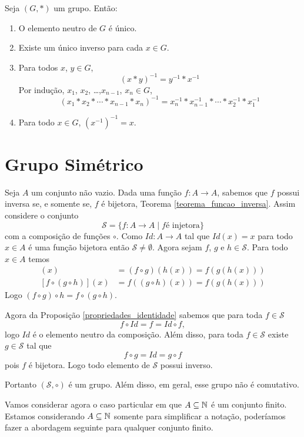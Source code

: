\begin{proposicao}
	Seja $(G,*)$ um grupo. Então:
	\begin{enumerate}[label={\roman*})]
		\item O elemento neutro de $G$ {\'e} {\'u}nico.

		\item Existe um {\'u}nico inverso para cada $x \in G$.

		\item Para todos $x$, $y \in G$,
		\[
			(x*y)^{-1} = y^{-1}*x^{-1}
		\]
		Por indu{\c c}{\~a}o, $x_1$, $x_2$, \dots ,$x_{n-1}$, $x_n \in G$,
		\[
			(x_1*x_2*\cdots *x_{n-1}*x_{n})^{-1} = x^{-1}_{n}*x^{-1}_{n-1}*\cdots *x^{-1}_2*x^{-1}_1
		\]
		\item Para todo $x \in G$, $(x^{-1})^{-1} = x$.
	\end{enumerate}
\end{proposicao}


\section{Grupo Simétrico} %
\label{sec:grupo_simétrico}

Seja $A$ um conjunto não vazio. Dada uma função $f : A \to A$, sabemos que $f$ possui inversa se, e somente se, $f$ é bijetora, Teorema \ref{teorema_funcao_inversa}. Assim considere o conjunto
\[
	\mathcal{S} = \{ f : A \to A \mid f \mbox{é injetora}\}
\]
com a composição de funções $\circ$. Como $Id : A \to A$ tal que $Id(x) = x$ para todo $x \in A$ é uma função bijetora então $\mathcal{S} \ne \emptyset$. Agora sejam $f$, $g$ e $h \in \mathcal{S}$. Para todo $x \in A$ temos
\begin{align*}
	[(f\circ g)\circ h](x) &= (f \circ g)(h(x)) = f(g(h(x)))\\
	[f\circ(g\circ h)](x) &= f((g\circ h)(x)) = f(g(h(x)))
\end{align*}
Logo $(f\circ g)\circ h = f\circ(g\circ h)$.

Agora da Proposição \ref{propriedades_identidade} sabemos que para toda $f \in \mathcal{S}$
\[
	f\circ Id = f = Id\circ f,
\]
logo $Id$ é o elemento neutro da composição. Além disso, para toda $f \in \mathcal{S}$ existe $g \in \mathcal{S}$ tal que
\[
	f\circ g = Id = g \circ f
\]
pois $f$ é bijetora. Logo todo elemento de $\mathcal{S}$ possui inverso.

Portanto $(\mathcal{S}, \circ)$ é um grupo. Além disso, em geral, esse grupo não é comutativo.

Vamos considerar agora o caso particular em que $A \subseteq \mathbb{N}$ é um conjunto finito. Estamos considerando $A \subseteq \mathbb{N}$ somente para simplificar a notação, poderíamos fazer a abordagem seguinte para qualquer conjunto finito.

